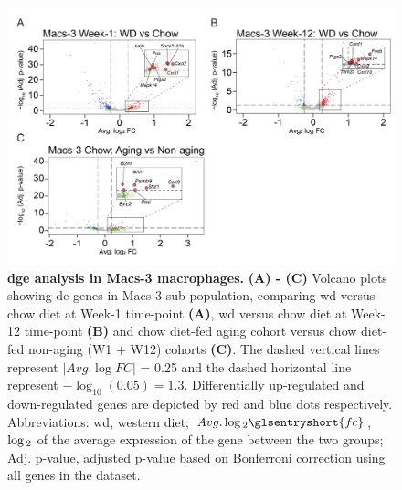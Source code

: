 \begin{figure}[t]
\centering
\includegraphics[width=\linewidth]{Chapter4/Fig/F2-11-01.png}
\caption[ analysis in Macs-3 macrophages]{\textbf{\gls{dge} analysis in Macs-3 macrophages.} \textbf{(A) - (C)} Volcano plots showing \gls{de} genes in Macs-3 sub-population, comparing \gls{wd} versus chow diet at Week-1 time-point \textbf{(A)}, \gls{wd} versus chow diet at Week-12 time-point \textbf{(B)} and chow diet-fed aging cohort versus chow diet-fed non-aging (W1 + W12) cohorts \textbf{(C)}. The dashed vertical lines represent $  \left|Avg. \log FC \right| $ = 0.25 and the dashed horizontal line represent $-\log_{10}(\num{0.05}) = 1.3$. Differentially up-regulated and down-regulated genes are depicted by red and blue dots respectively. Abbreviations: \gls{wd}, western diet; $Avg. \log\textsubscript{2} \glsentryshort{fc}$, $\log\textsubscript{2}$  of the average expression of the gene between the two groups; Adj. p-value, adjusted p-value based on Bonferroni correction using all genes in the dataset.}
\label{fig:chp2_scrna_macrophages_macs3_dge}
\end{figure}

